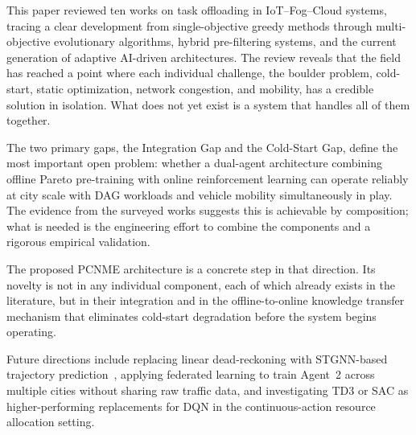 \documentclass[12pt,a4paper]{article}
\begin{document}
This paper reviewed ten works on task offloading in IoT--Fog--Cloud systems,
tracing a clear development from single-objective greedy methods through
multi-objective evolutionary algorithms, hybrid pre-filtering systems, and the
current generation of adaptive AI-driven architectures. The review reveals that
the field has reached a point where each individual challenge, the boulder problem,
cold-start, static optimization, network congestion, and mobility, has a credible
solution in isolation. What does not yet exist is a system that handles all of
them together.

The two primary gaps, the Integration Gap and the Cold-Start Gap, define the
most important open problem: whether a dual-agent architecture combining offline
Pareto pre-training with online reinforcement learning can operate reliably at
city scale with DAG workloads and vehicle mobility simultaneously in play. The
evidence from the surveyed works suggests this is achievable by composition; what
is needed is the engineering effort to combine the components and a rigorous
empirical validation.

The proposed PCNME architecture is a concrete step in that direction. Its novelty
is not in any individual component, each of which already exists in the literature,
but in their integration and in the offline-to-online knowledge transfer mechanism
that eliminates cold-start degradation before the system begins operating.

Future directions include replacing linear dead-reckoning with STGNN-based
trajectory prediction~\cite{zhu2025spatiotemporal}, applying federated learning
to train Agent~2 across multiple cities without sharing raw traffic data, and
investigating TD3 or SAC as higher-performing replacements for DQN in the
continuous-action resource allocation setting.
\end{document}

